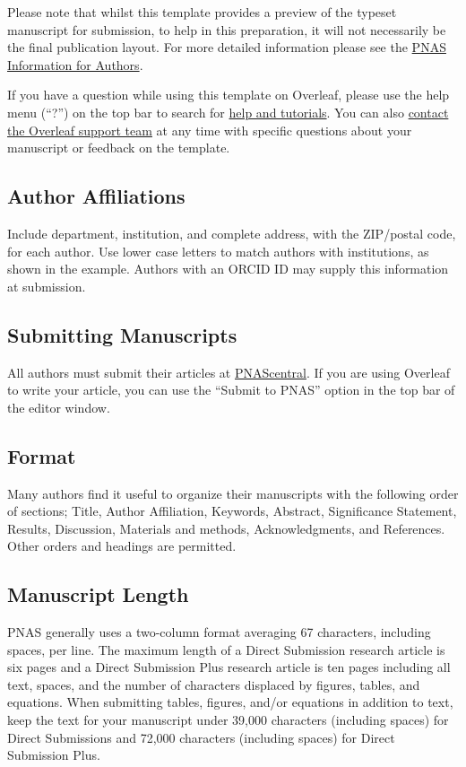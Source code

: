 \documentclass[9pt,twocolumn,twoside,lineno]{pnas-new}
\begin{document}
Please note that whilst this template provides a preview of the typeset manuscript for submission, to help in this preparation, it will not necessarily be the final publication layout. For more detailed information please see the \href{http://www.pnas.org/site/authors/format.xhtml}{PNAS Information for Authors}.

If you have a question while using this template on Overleaf, please use the help menu (``?'') on the top bar to search for \href{https://www.overleaf.com/help}{help and tutorials}. You can also \href{https://www.overleaf.com/contact}{contact the Overleaf support team} at any time with specific questions about your manuscript or feedback on the template.

\subsection*{Author Affiliations}

Include department, institution, and complete address, with the ZIP/postal code, for each author. Use lower case letters to match authors with institutions, as shown in the example. Authors with an ORCID ID may supply this information at submission.

\subsection*{Submitting Manuscripts}

All authors must submit their articles at \href{http://www.pnascentral.org/cgi-bin/main.plex}{PNAScentral}. If you are using Overleaf to write your article, you can use the ``Submit to PNAS'' option in the top bar of the editor window. 

\subsection*{Format}

Many authors find it useful to organize their manuscripts with the following order of sections;  Title, Author Affiliation, Keywords, Abstract, Significance Statement, Results, Discussion, Materials and methods, Acknowledgments, and References. Other orders and headings are permitted.

\subsection*{Manuscript Length}

PNAS generally uses a two-column format averaging 67 characters, including spaces, per line. The maximum length of a Direct Submission research article is six pages and a Direct Submission Plus research article is ten pages including all text, spaces, and the number of characters displaced by figures, tables, and equations.  When submitting tables, figures, and/or equations in addition to text, keep the text for your manuscript under 39,000 characters (including spaces) for Direct Submissions and 72,000 characters (including spaces) for Direct Submission Plus.
\end{document}
